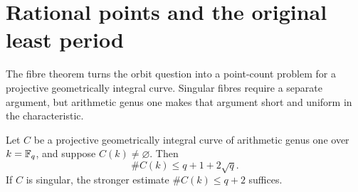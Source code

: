 \section{Rational points and the original least period}\label{sec:periods}

The fibre theorem turns the orbit question into a point-count problem
for a projective geometrically integral curve. Singular fibres require
a separate argument, but arithmetic genus one makes that argument short
and uniform in the characteristic.

\begin{lemma}\label{lem:point-bound}
Let \(C\) be a projective geometrically integral curve of arithmetic
genus one over \(k=\mathbb F_q\), and suppose \(C(k)\ne\varnothing\).
Then
\[
\#C(k)\le q+1+2\sqrt q.
\]
If \(C\) is singular, the stronger estimate \(\#C(k)\le q+2\)
suffices.
\end{lemma}

